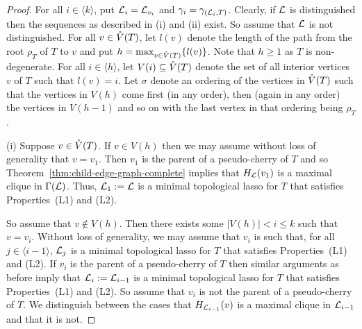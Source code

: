 \begin{proof}
  For all $i\in \langle k\rangle$, put ${\mathcal L}_i={\mathcal L}_{v_{i}}$ and
  $\gamma_i=\gamma_{({\mathcal L}_i,T)}$.  Clearly, if ${\mathcal L}$ is distinguished then the
  sequences as described in (i) and (ii) exist. So assume that ${\mathcal L}$ is not
  distinguished.  For all $v\in \mathring{V}(T)$, let $l(v)$ denote the length of the
  path from the root $\rho_T$ of $T$ to $v$ and put $h=\max_{v\in
    \mathring{V}(T)}\{l(v)\}$.  Note that $h\geq 1$ as $T$ is non-degenerate.  For all
  $i\in \langle h\rangle$, let $V(i)\subseteq \mathring{V}(T)$ denote the set of all
  interior vertices $v$ of $T$ such that $l(v)=i$.  Let $\sigma$ denote an
  ordering of the vertices in $\mathring{V}(T)$ such that the vertices in $V(h)$ come
  first (in any order), then (again in any order) the vertices in $V(h-1)$ and
  so on with the last vertex in that ordering being $\rho_T$.

  (i) Suppose $v\in \mathring{V}(T)$. If $v\in V(h)$ then we may assume without loss of
  generality that $v=v_1$. Then $v_1$ is the parent of a pseudo-cherry of $T$
  and so Theorem~\ref{thm:child-edge-graph-complete} implies that
  $H_{{\mathcal L}}(v_1)$ is a maximal clique in $\Gamma({\mathcal L})$. Thus, ${\mathcal L}_1:={\mathcal L}$ is a
  minimal topological lasso for $T$ that satisfies Properties~(L1) and (L2).

  So assume that $v\not\in V(h)$. Then there exists some $|V(h)|< i\leq k$
  such that $v=v_i$. Without loss of generality, we may assume that $v_i$ is
  such that, for all $j\in \langle i-1\rangle$, ${\mathcal L}_j$ is a minimal
  topological lasso for $T$ that satisfies Properties~(L1) and (L2).  If $v_i$
  is the parent of a pseudo-cherry of $T$ then similar arguments as before
  imply that ${\mathcal L}_i:={\mathcal L}_{i-1}$ is a minimal topological lasso for $T$ that
  satisfies Properties~(L1) and (L2). So assume that $v_i$ is not the parent
  of a pseudo-cherry of $T$.  We distinguish between the cases that
  $H_{{\mathcal L}_{i-1}}(v)$ is a maximal clique in ${\mathcal L}_{i-1}$ and that it is not.


\end{proof}
